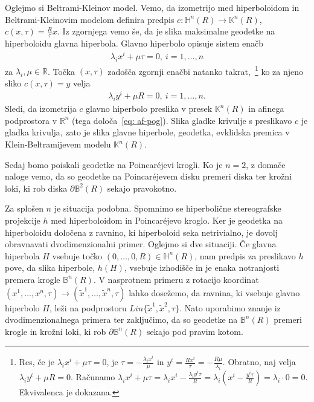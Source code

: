 \documentclass[a4paper]{article}
\begin{document}
Oglejmo si Beltrami-Kleinov model. Vemo, da izometrijo med hiperboloidom in Beltrami-Kleinovim modelom definira predpis $c \colon \mathbb{H}^{n}(R) \to \mathbb{K}^{n}(R)$, $c(x,\tau) = \frac{R}{\tau}x$. Iz zgornjega vemo še, da je slika maksimalne geodetke na hiperboloidu glavna hiperbola.
Glavno hiperbolo opisuje sistem enačb 
\begin{gather}
\lambda_{i}x^{i} + \mu \tau = 0, \ i=1, \dots , n
\end{gather}
za $\lambda_{i}, \mu \in \mathbb{R}$.
Točka $(x,\tau)$ zadošča zgornji enačbi natanko takrat,~\footnote{Res, če je $\lambda_{i}x^{i}+\mu \tau=0$, je $\tau=-\frac{\lambda_{i}x^{i}}{\mu}$ in $y^{i}=\frac{Rx^{i}}{\tau}=-\frac{R\mu}{\lambda_{i}}$. 
Obratno, naj velja $\lambda_{i}y^{i} + \mu R = 0$. Računamo $\lambda_{i}x^{i}+\mu \tau = \lambda_{i}x^{i} - \frac{\lambda_{i}y^{i}\tau}{R} = \lambda_{i} (x^{i} - \frac{y^{i}\tau}{R}) = \lambda_{i} \cdot 0 = 0$. Ekvivalenca je dokazana.} 
ko za njeno sliko $c(x,\tau)=y$ velja 
\begin{gather}\label{eq: af-pog}
\lambda_{i}y^{i} + \mu R = 0, \ i=1, \dots , n.
\end{gather}
Sledi, da izometrija $c$ glavno hiperbolo preslika v presek $\mathbb{K}^{n}(R)$ in afinega podprostora v $\mathbb{R}^{n}$ (tega določa~\ref{eq: af-pog}). Slika gladke krivulje s preslikavo $c$ je gladka krivulja, zato je slika glavne hiperbole, geodetka, evklidska premica v Klein-Beltramijevem modelu $\mathbb{K}^{n}(R)$.\newline

Sedaj bomo poiskali geodetke na Poincar\'ejevi krogli.
Ko je $n=2$, z domače naloge vemo, da so geodetke na Poincar\'ejevem disku premeri diska ter krožni loki, ki rob diska $\partial \mathbb{B}^{2}(R)$ sekajo pravokotno.

Za splošen $n$ je situacija podobna. Spomnimo se hiperbolične stereografske projekcije $h$ med hiperboloidom in Poincar\'ejevo kroglo. Ker je geodetka na hiperboloidu določena z ravnino, ki hiperboloid seka netrivialno, je dovolj obravnavati dvodimenzionalni primer. Oglejmo si dve situaciji. Če glavna hiperbola $H$ vsebuje točko $(0, \dots , 0,R) \in \mathbb{H}^{n}(R)$, nam predpis za preslikavo $h$ pove, da slika hiperbole, $h(H)$, vsebuje izhodišče in je enaka notranjosti premera krogle $\mathbb{B}^{n}(R)$. V nasprotnem primeru z rotacijo koordinat $(x^{1}, \dots , x^{n}, \tau) \to (\tilde{x}^{1}, \dots , \tilde{x}^{n}, \tau)$ lahko dosežemo, da ravnina, ki vsebuje glavno hiperbolo $H$, leži na podprostoru $\mathit{Lin} \{ \tilde{x}^{1}, \tilde{x}^{2}, \tau \}$. Nato uporabimo znanje iz dvodimenzionalnega primera ter zaključimo, da so geodetke na $\mathbb{B}^{n}(R)$ premeri krogle in krožni loki, ki rob $\partial \mathbb{B}^{n}(R)$ sekajo pod pravim kotom.\newline
\end{document}
